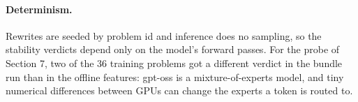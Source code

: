 \documentclass{article}
\begin{document}
\paragraph{Determinism.} Rewrites are seeded by problem id and inference does no sampling, so the stability verdicts depend only on the model's forward passes. For the probe of Section 7, two of the 36 training problems got a different verdict in the bundle run than in the offline features: gpt-oss is a mixture-of-experts model, and tiny numerical differences between GPUs can change the experts a token is routed to.
\end{document}
